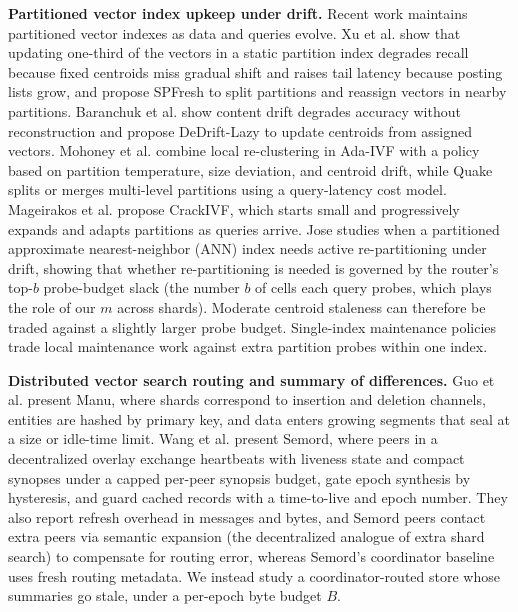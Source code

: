 \textbf{Partitioned vector index upkeep under drift.} Recent work maintains partitioned vector indexes as data and queries evolve. Xu et al. \cite{xu2023spfresh} show that updating one-third of the vectors in a static partition index degrades recall because fixed centroids miss gradual shift and raises tail latency because posting lists grow, and propose SPFresh to split partitions and reassign vectors in nearby partitions. Baranchuk et al. \cite{baranchuk2023dedrift} show content drift degrades accuracy without reconstruction and propose DeDrift-Lazy to update centroids from assigned vectors. Mohoney et al. \cite{mohoney2024adaivf} combine local re-clustering in Ada-IVF with a policy based on partition temperature, size deviation, and centroid drift, while Quake \cite{mohoney2025quake} splits or merges multi-level partitions using a query-latency cost model. Mageirakos et al. \cite{mageirakos2025cracking} propose CrackIVF, which starts small and progressively expands and adapts partitions as queries arrive. Jose \cite{jose2026repartition} studies when a partitioned approximate nearest-neighbor (ANN) index needs active re-partitioning under drift, showing that whether re-partitioning is needed is governed by the router's top-$b$ probe-budget slack (the number $b$ of cells each query probes, which plays the role of our $m$ across shards). Moderate centroid staleness can therefore be traded against a slightly larger probe budget. Single-index maintenance policies trade local maintenance work against extra partition probes within one index.

\textbf{Distributed vector search routing and summary of differences.} Guo et al. \cite{guo2022manu} present Manu, where shards correspond to insertion and deletion channels, entities are hashed by primary key, and data enters growing segments that seal at a size or idle-time limit. Wang et al. \cite{semord2026} present Semord, where peers in a decentralized overlay exchange heartbeats with liveness state and compact synopses under a capped per-peer synopsis budget, gate epoch synthesis by hysteresis, and guard cached records with a time-to-live and epoch number. They also report refresh overhead in messages and bytes, and Semord peers contact extra peers via semantic expansion (the decentralized analogue of extra shard search) to compensate for routing error, whereas Semord's coordinator baseline uses fresh routing metadata. We instead study a coordinator-routed store whose summaries go stale, under a per-epoch byte budget $B$.

